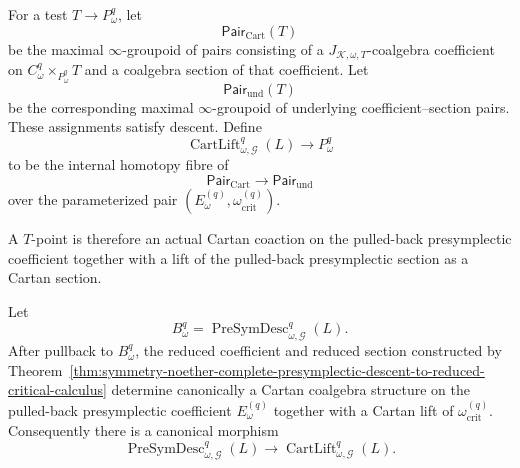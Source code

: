 \begin{construction}
\label{constr:symmetry-noether-internal-cartan-lift-of-the-presymplectic-pair}
For a test $T\to P_\omega^q$, let
\[
\mathsf{Pair}_{\mathrm{Cart}}(T)
\]
be the maximal $\infty$-groupoid of pairs consisting of a
$J_{\mathcal K,\omega,T}$-coalgebra coefficient on
$C_\omega^q\times_{P_\omega^q}T$ and a coalgebra section of that coefficient.
Let
\[
\mathsf{Pair}_{\mathrm{und}}(T)
\]
be the corresponding maximal $\infty$-groupoid of underlying coefficient--section
pairs.  These assignments satisfy descent.  Define
\[
\boxed{
\operatorname{CartLift}_{\omega,\mathcal G}^{q}(L)
\longrightarrow
P_\omega^q
}
\]
to be the internal homotopy fibre of
\[
\mathsf{Pair}_{\mathrm{Cart}}
\longrightarrow
\mathsf{Pair}_{\mathrm{und}}
\]
over the parameterized pair
$(E_\omega^{(q)},\omega_{\mathrm{crit}}^{(q)})$.
\end{construction}

A $T$-point is therefore an actual Cartan coaction on the pulled-back
presymplectic coefficient together with a lift of the pulled-back
presymplectic section as a Cartan section.

\begin{proposition}
\label{prop:symmetry-noether-complete-descent-supplies-cartan-presymplectic-pair}
Let
\[
B_\omega^q
=
\operatorname{PreSymDesc}_{\omega,\mathcal G}^{q}(L).
\]
After pullback to $B_\omega^q$, the reduced coefficient and reduced section
constructed by
Theorem~\ref{thm:symmetry-noether-complete-presymplectic-descent-to-reduced-critical-calculus}
determine canonically a Cartan coalgebra structure on the pulled-back
presymplectic coefficient $E_\omega^{(q)}$ together with a Cartan lift of
$\omega_{\mathrm{crit}}^{(q)}$.  Consequently there is a canonical morphism
\[
\boxed{
\operatorname{PreSymDesc}_{\omega,\mathcal G}^{q}(L)
\longrightarrow
\operatorname{CartLift}_{\omega,\mathcal G}^{q}(L).
}
\]
\end{proposition}

